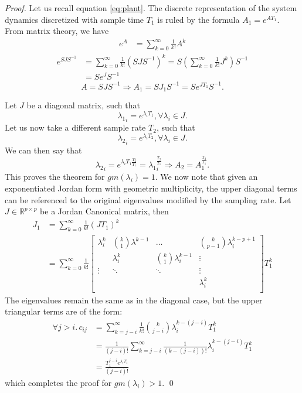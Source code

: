 \documentclass[a4paper,UKenglish]{lipics-v2018}
\newcommand{\mat}[1]{{#1}}
\renewcommand{\vec}[1]{{#1}}
\begin{document}
 \begin{proof}
 Let us recall equation \ref{eq:plant}. The discrete representation of the system dynamics discretized with sample time $T_1$ is ruled by the formula
 $\mat{A}_1 = e^{\mat{A} T_1}$. From matrix theory, we have 
\begin{align*}
 e^{\mat{A}}&=\sum_{k=0}^\infty \frac{1}{k!}\mat{A}^k
\end{align*} 
\begin{align*} 
 e^{\mat{S}\mat{J}\mat{S}^{-1}}&=\sum_{k=0}^\infty \frac{1}{k!}\left(\mat{S}\mat{J}\mat{S}^{-1}\right)^k
 =\mat{S} \left (\sum_{k=0}^\infty \frac{1}{k!}\mat{J}^k\right) \mat{S}^{-1}\nonumber\\
 &=\mat{S}e^{\mat{J}}\mat{S}^{-1}
\end{align*} 
\begin{equation*}
\mat{A}=\mat{S}\mat{J}\mat{S}^{-1} \Rightarrow \vec{A}_1 = \mat{S}\mat{J}_1\mat{S}^{-1}= \mat{S}e^{\mat{J} T_1}\mat{S}^{-1}.
 \end{equation*}
 
 Let $\mat{J}$ be a diagonal matrix, such that 
 $${\lambda_1}_i=e^{\lambda_i T_1}, \forall \lambda_i \in \mat{J}.$$
 Let us now take a different sample rate $T_2$, such that 
 $${\lambda_2}_i=e^{\lambda_i T_2}, \forall \lambda_i \in \mat{J}.$$
 We can then say that 
 \begin{equation*}
 {\lambda_2}_i=e^{\lambda_i T_1 \frac{T_2}{T_1}}={\lambda_1}_i^{\frac{T_2}{T_1}} \Rightarrow A_2=A_1^{\frac{T_2}{T_1}}.
 \end{equation*}
 This proves the theorem for $gm(\lambda_i)=1$.
 We now note that given an exponentiated Jordan form with geometric multiplicity, the upper diagonal terms can be
 referenced to the original eigenvalues modified by the sampling rate.
  Let $\mat{J}\in \mathbb{R}^{p \times p}$ be a Jordan Canonical matrix, then
\begin{align*}
 \mat{J}_1&=\sum_{k=0}^\infty \frac{1}{k!}\left(\mat{J}T_1\right)^k\nonumber\\
 &=\sum_{k=0}^\infty \frac{1}{k!} \left [ \begin{array}{cccc}
 \lambda_i^k  & \binom{k}{1}  \lambda^{k-1} & \hdots  & \binom{k}{p-1} \lambda_i^{k-p+1} \\
& \lambda_i^k  & \binom{k}{1}  \lambda_i^{k-1} & \vdots \\
\vdots & \ddots & \ddots & \vdots \\
& &  &\lambda_i^k \\
\end{array} \right ] T_1^k
\end{align*}
The eigenvalues remain the same as in the diagonal case, but the upper triangular terms are of the form:
\begin{align*}
\forall j>i.\, c_{ij}&=\sum_{k=j-i}^\infty \frac{1}{k!}\binom{k}{j-i} \lambda_i^{k-(j-i)}T_1^k\\
&=\frac{1}{(j-i)!}\sum_{k=j-i}^\infty \frac{1}{(k-(j-i))!} \lambda_i^{k-(j-i)}T_1^k\nonumber\\
&=\frac{T_1^{j-i}e^{\lambda_i T_1}}{(j-i)!}\nonumber
\end{align*}
which completes the proof for $gm(\lambda_i)>1$. \qed
\end{proof}
\end{document}
